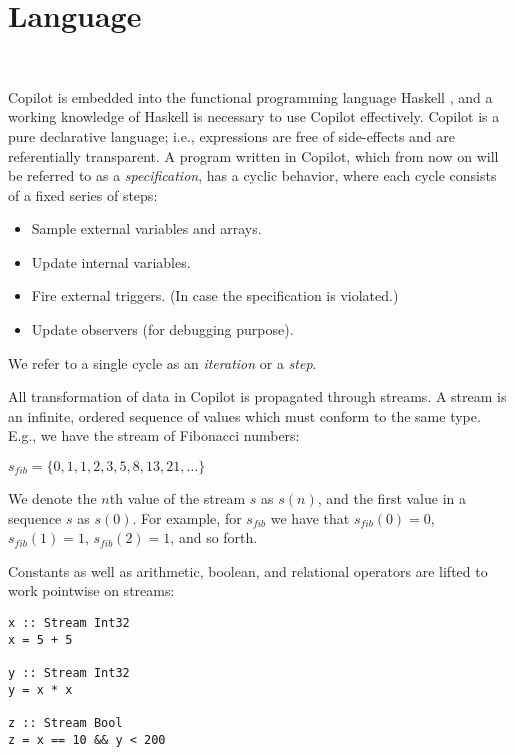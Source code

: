 
\section{Language}~\label{sec:language}

Copilot is embedded into the functional programming language Haskell
\cite{PeytonJones02}, and a working knowledge of Haskell is necessary to use
Copilot effectively. Copilot is a pure declarative language; i.e., expressions
are free of side-effects and are referentially transparent.  A program written
in Copilot, which from now on will be referred to as a \emph{specification}, has
a cyclic behavior, where each cycle consists of a fixed series of steps:

\begin{itemize}
\item Sample external variables and arrays.
\item Update internal variables.
\item Fire external triggers. (In case the specification is violated.)
\item Update observers (for debugging purpose).
\end{itemize}

\noindent We refer to a single cycle as an \emph{iteration} or a \emph{step}.

All transformation of data in Copilot is propagated through streams.
A stream is an infinite, ordered sequence of values which must conform to the same type.
E.g., we have the stream of Fibonacci numbers:

\begin{center}
$s_{fib} = \{0, 1, 1, 2, 3, 5, 8, 13, 21, \dots \}$
\end{center}

\noindent We denote the $n$th value of the stream $s$ as $s(n)$, and the first
value in a sequence $s$ as $s(0)$. For example, for $s_{fib}$ we have that $s_{fib}(0) = 0$,
$s_{fib}(1) = 1$, $s_{fib}(2) = 1$, and so forth.

Constants as well as arithmetic, boolean, and relational operators are
lifted to work pointwise on streams:

\noindent
\begin{lstlisting}[language = Copilot, frame = single]
x :: Stream Int32
x = 5 + 5

y :: Stream Int32
y = x * x

z :: Stream Bool
z = x == 10 && y < 200
\end{lstlisting}


